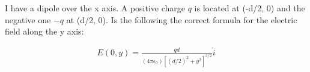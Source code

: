 \documentclass[12pt]{article}
\begin{document}
I have a dipole over the x axis. A positive charge $q$ is located at (-d/2, 0)
and the negative one $-q$ at (d/2, 0). Is the following the correct formula for the
electric field along the y axis:

\begin{align*}
    E(0,y)=\frac{qd}{(4\pi\epsilon_0)\left[(d/2)^2+y^2\right]^{3/2}}\hat{i}
\end{align*}
\end{document}
